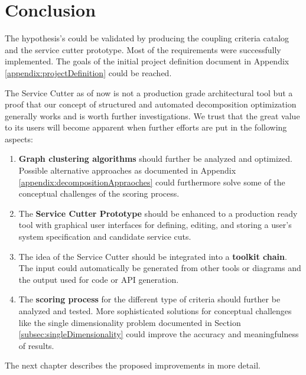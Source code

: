 \section{Conclusion}

The hypothesis's could be validated by producing the coupling criteria catalog and the service cutter prototype. Most of the requirements were successfully implemented. The goals of the initial project definition document in Appendix \ref{appendix:projectDefinition} could be reached.

The Service Cutter as of now is not a production grade architectural tool but a proof that our concept of structured and automated decomposition optimization generally works and is worth further investigations. We trust that the great value to its users will become apparent when further efforts are put in the following aspects:

\begin{enumerate}
	\item \textbf{Graph clustering algorithms} should further be analyzed and optimized. Possible alternative approaches as documented in Appendix \ref{appendix:decompositionAppraoches} could furthermore solve some of the conceptual challenges of the scoring process.
	\item The \textbf{Service Cutter Prototype} should be enhanced to a production ready tool with graphical user interfaces for defining, editing, and storing a user's system specification and candidate service cuts. 
	\item The idea of the Service Cutter should be integrated into a \textbf{toolkit chain}. The input could automatically be generated from other tools or diagrams and the output used for code or \gls{API} generation.
	\item The \textbf{scoring process} for the different type of criteria should further be analyzed and tested. More sophisticated solutions for conceptual challenges like the single dimensionality problem documented in Section \ref{subsec:singleDimensionality} could improve the accuracy and meaningfulness of results. 
\end{enumerate}

\bigskip

The next chapter describes the proposed improvements in more detail.
